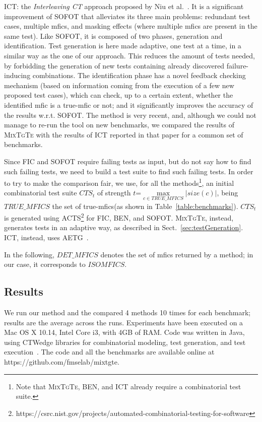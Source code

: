 \documentclass[
12pt, %
oneside, %
english, %
singlespacing, %
headsepline, %
consistentlayout, %
]{MastersDoctoralThesis} %
\newcommand{\mix}{\textsc{MixTgTe}\xspace}
\newcommand{\truemfic}{true-\textsf{mfic}\xspace}
\newcommand{\truemfics}{true-\textsf{mfics}\xspace}
\newcommand{\mfic}{\textsf{mfic}\xspace}
\newcommand{\mfics}{\textsf{mfics}\xspace}
\newcommand{\cts}{\ensuremath{\mathit{CTS}}\xspace}
\newcommand{\isoMficsSet}{\ensuremath{\mathit{ISOMFICS}}\xspace}
\newcommand{\trueMficsSet}{\ensuremath{\mathit{TRUE\_MFICS}}\xspace}
\newcommand{\detMficsSet}{\ensuremath{\mathit{DET\_MFICS}}\xspace}
\theoremstyle{plain}
\theoremstyle{definition}
\theoremstyle{remark}
\theoremstyle{plain}
\theoremstyle{plain}
\theoremstyle{remark}
\begin{document}
\begin{asparadesc}
	\item[ICT:] the \textit{Interleaving CT} approach proposed by Niu et al.~\cite{Niu2018interleaving}. It is a significant improvement of SOFOT that alleviates its three main problems: redundant test cases, multiple \mfics, and masking effects (where multiple \mfics are present in the same test). Like SOFOT, it is composed of two phases, generation and identification. Test generation is here made adaptive, one test at a time, in a similar way as the one of our approach. This reduces the amount of tests needed, by forbidding the generation of new tests containing already discovered failure-inducing combinations. The identification phase has a novel feedback checking mechanism (based on information coming from the execution of a few new proposed test cases), which can check, up to a certain extent, whether the identified \mfic is a \truemfic or not; and it significantly improves the accuracy of the results w.r.t. SOFOT. The method is very recent, and, although we could not manage to re-run the tool on new benchmarks, we compared the results of \mix with the results of ICT reported in that paper for a common set of benchmarks.
\end{asparadesc}

Since FIC and SOFOT require failing tests as input, but do not say how to find such failing tests, we need to build a test suite to find such failing tests. In order to try to make the comparison fair, we use, for all the methods\footnote{Note that \mix, BEN, and ICT already require a combinatorial test suite.}, an initial combinatorial test suite $\cts_t$ of strength $t$=$\max\limits_{c \in \trueMficsSet}|\mathit{size}(c)|$, being \trueMficsSet the set of \truemfics (as shown in Table~\ref{table:benchmarks}). 
$\cts_t$ is generated using ACTS\footnote{https://csrc.nist.gov/projects/automated-combinatorial-testing-for-software} for FIC, BEN, and SOFOT. \mix, instead, generates tests in an adaptive way, as described in Sect.~\ref{sec:testGeneration}. ICT, instead, uses AETG~\cite{AETG}.

In the following, \detMficsSet denotes the set of \mfics returned by a method; in our case, it corresponds to \isoMficsSet.

\subsection{Results}\label{sec:results}

We run our method and the compared 4 methods 10 times for each benchmark; results are the average across the runs. Experiments have been executed on a Mac OS X 10.14, Intel Core i3, with 4GB of RAM. Code was written in Java, using CTWedge libraries for combinatorial modeling, test generation, and test execution~\cite{IWCTGargantini2018}. The code and all the benchmarks are available online at https://github.com/fmselab/mixtgte.
\end{document}
